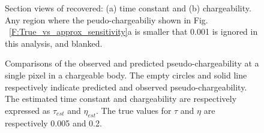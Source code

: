 \documentclass[extra,mreferee]{gji}
\begin{document}
\begin{figure}
  \caption{Section views of recovered: (a) time constant and (b) chargeability. Any region where the peudo-chargeabiliy shown in Fig. ~\ref{F:True_vs_approx_sensitivity}a is smaller that 0.001 is ignored in this analysis, and blanked.}
  \label{F:EtaTauSection}
\end{figure}

\begin{figure}
  \caption{Comparisons of the observed and predicted pseudo-chargeability at a single pixel in a chargeable body.
  The empty circles and solid line respectively indicate predicted and observed pseudo-chargeability. The estimated time constant and chargeability are respectively expressed as $\tau_{est}$ and $\eta_{est}$. The true values for $\tau$ and $\eta$ are respectively 0.005 and 0.2.}
  \label{F:IntrinsicIP}
\end{figure}

\clearpage
\end{document}
